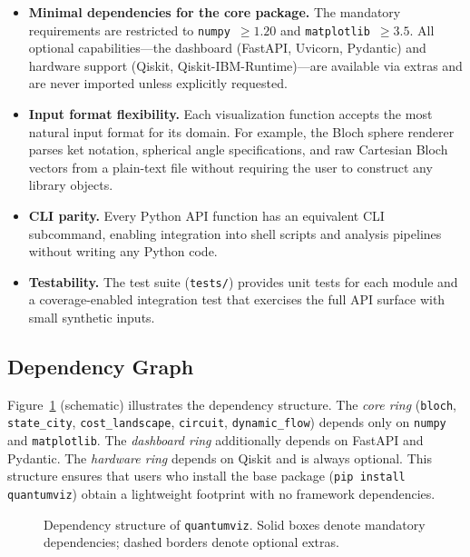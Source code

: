 \documentclass{SciPost}
\begin{document}
\begin{itemize}
  \item \textbf{Minimal dependencies for the core package.}  The mandatory
    requirements are restricted to \texttt{numpy}~$\geq 1.20$ and
    \texttt{matplotlib}~$\geq 3.5$.  All optional capabilities---the dashboard
    (FastAPI, Uvicorn, Pydantic) and hardware support (Qiskit,
    Qiskit-IBM-Runtime)---are available via extras and are never imported
    unless explicitly requested.

  \item \textbf{Input format flexibility.}  Each visualization function
    accepts the most natural input format for its domain.  For example, the
    Bloch sphere renderer parses ket notation, spherical angle specifications,
    and raw Cartesian Bloch vectors from a plain-text file without requiring
    the user to construct any library objects.

  \item \textbf{CLI parity.}  Every Python API function has an equivalent CLI
    subcommand, enabling integration into shell scripts and analysis pipelines
    without writing any Python code.

  \item \textbf{Testability.}  The test suite (\texttt{tests/}) provides unit
    tests for each module and a coverage-enabled integration test that
    exercises the full API surface with small synthetic inputs.
\end{itemize}

\subsection{Dependency Graph}

Figure~\ref{fig:depgraph} (schematic) illustrates the dependency structure.
The \emph{core ring} (\texttt{bloch}, \texttt{state\_city},
\texttt{cost\_landscape}, \texttt{circuit}, \texttt{dynamic\_flow}) depends
only on \texttt{numpy} and \texttt{matplotlib}.
The \emph{dashboard ring} additionally depends on FastAPI and Pydantic.
The \emph{hardware ring} depends on Qiskit and is always optional.
This structure ensures that users who install the base package
(\texttt{pip install quantumviz}) obtain a lightweight footprint with no
framework dependencies.

\begin{figure}[h]
\centering
\caption{Dependency structure of \texttt{quantumviz}.
         Solid boxes denote mandatory dependencies; dashed borders denote
         optional extras.}
\label{fig:depgraph}
\end{figure}
\end{document}
